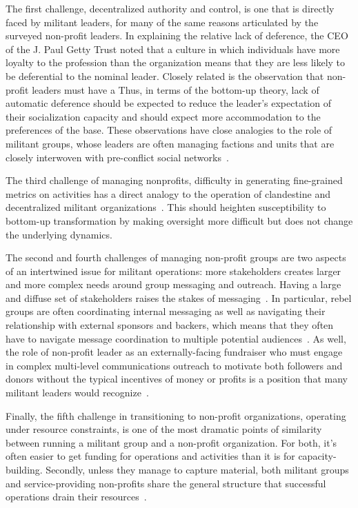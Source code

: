 The first challenge, decentralized authority and control, is one that is directly faced by militant leaders, for many of the same reasons articulated by the surveyed non-profit leaders. In explaining the relative lack of deference, the CEO of the J. Paul Getty Trust noted that a culture in which individuals have more loyalty to the profession than the organization means that they are less likely to be deferential to the nominal leader.  Closely related is the observation that non-profit leaders must have a  Thus, in terms of the bottom-up theory, lack of automatic deference should be expected to reduce the leader’s expectation of their socialization capacity and should expect more accommodation to the preferences of the base.  These observations have close analogies to the role of militant groups, whose leaders are often managing factions and units that are closely interwoven with pre-conflict social networks~\autocite{staniland2014networks}.

 The third challenge of managing nonprofits, difficulty in generating fine-grained metrics on activities has a direct analogy to the operation of clandestine and decentralized militant organizations~\autocite{shapiro2012moral, taliento2005corporate}. This should heighten susceptibility to bottom-up transformation by making oversight more difficult but does not change the underlying dynamics.  
 
 The second and fourth challenges of managing non-profit groups are two aspects of an intertwined issue for militant operations: more stakeholders creates larger and more complex needs around group messaging and outreach. Having a large and diffuse set of stakeholders raises the stakes of messaging~\autocite{bob2005marketing}. In particular, rebel groups are often coordinating internal messaging as well as navigating their relationship with external sponsors and backers, which means that they often have to navigate message coordination to multiple potential audiences~\autocite{jones2019manifesto, szekely2017politics, coggins2015rebel, popovic2017fragile, tamm2016rebel, huang2016rebel}.
 As well, the role of non-profit leader as an externally-facing fundraiser who must engage in complex multi-level communications outreach to motivate both followers and donors without the typical incentives of money or profits is a position that many militant leaders would recognize~\autocite{taliento2005corporate, bob2005marketing}.

Finally, the fifth challenge in transitioning to non-profit organizations, operating under resource constraints, is one of the most dramatic points of similarity between running a militant group and a non-profit organization. For both, it’s often easier to get funding for operations and activities than it is for capacity-building. Secondly, unless they manage to capture material, both militant groups and service-providing non-profits share the general structure that successful operations drain their resources~\autocite{taliento2005corporate}. 


